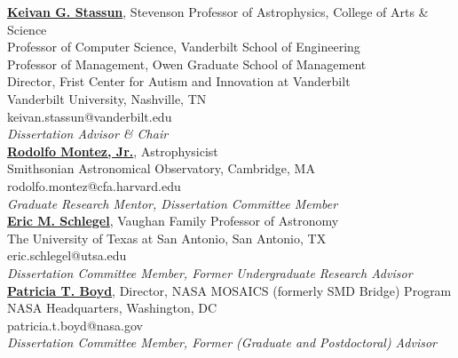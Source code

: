 \documentclass[letter,12pt]{article}
\begin{document}
\noindent
\href{http://astro.phy.vanderbilt.edu/~stassuk/}{\textbf{Keivan G. Stassun}}, Stevenson Professor of Astrophysics,  College of Arts \& Science \\
Professor of Computer Science, Vanderbilt School of Engineering \\
Professor of Management,     Owen Graduate School of Management \\
Director,  Frist Center for Autism and Innovation at Vanderbilt \\
Vanderbilt University, Nashville, TN \\
keivan.stassun@vanderbilt.edu \\
\textit{Dissertation Advisor \& Chair} \\

\noindent
\href{http://www.rudyphd.com/}{\textbf{Rodolfo Montez, Jr.}}, Astrophysicist \\
Smithsonian Astronomical Observatory, Cambridge, MA \\
rodolfo.montez@cfa.harvard.edu \\
\textit{Graduate Research Mentor, Dissertation Committee Member} \\

\noindent
\href{https://sciences.utsa.edu/faculty/profiles/schlegel-eric.html}{\textbf{Eric M. Schlegel}}, Vaughan Family Professor of Astronomy \\
The University of Texas at San Antonio, San Antonio, TX \\
eric.schlegel@utsa.edu \\
\textit{Dissertation Committee Member, Former Undergraduate Research Advisor} \\

\noindent
\href{https://science.gsfc.nasa.gov/sed/bio/patricia.t.boyd}{\textbf{Patricia T. Boyd}}, Director, NASA MOSAICS (formerly SMD Bridge) Program \\
NASA Headquarters, Washington, DC \\
patricia.t.boyd@nasa.gov \\
\textit{Dissertation Committee Member, Former (Graduate and Postdoctoral) Advisor} \\
\end{document}

